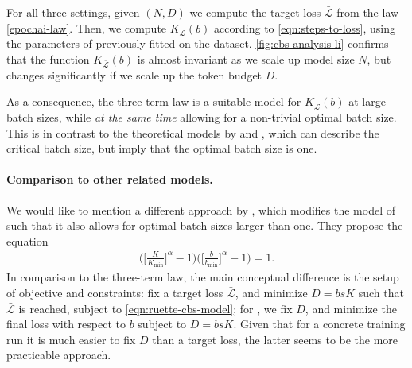 \documentclass[12pt,a4paper,twoside]{article}
\begin{document}
For all three settings, given $(N,D)$ we compute the target loss $\bar{\mathcal{L}}$ from the law \eqref{epochai-law}. Then, we compute $K_{\bar{\mathcal{L}}}(b)$ according to \eqref{eqn:steps-to-loss}, using the parameters of \tttl{} previously fitted on the \li{} dataset. \cref{fig:cbs-analysis-li} confirms that the function $K_{\bar{\mathcal{L}}}(b)$ is almost invariant as we scale up model size $N$, but changes significantly if we scale up the token budget $D$.


As a consequence, the three-term law is a suitable model for $K_{\bar{\mathcal{L}}}(b)$ at large batch sizes, while \emph{at the same time} allowing for a non-trivial optimal batch size. This is in contrast to the theoretical models by \citet{McCandlish2018,Bergsma2025} and \citet{Zhang2025}, which can describe the critical batch size, but imply that the optimal batch size is one.

\paragraph{Comparison to other related models.} We would like to mention a different approach by \citet[Section 4.5]{Ruette2026}, which modifies the model of \citet{McCandlish2018} such that it also allows for optimal batch sizes larger than one. They propose the equation
\begin{align}\label{eqn:ruette-cbs-model}
    \Big(\Big[\frac{K}{K_{\min}}\Big]^{\alpha} - 1\Big)\Big(\Big[\frac{b}{b_{\min}}\Big]^{\alpha} - 1\Big) = 1.    
\end{align}
%
In comparison to the three-term law, the main conceptual difference is the setup of objective and constraints: \citet{Ruette2026} fix a target loss $\bar{\mathcal{L}}$, and minimize $D=bsK$ such that $\bar{\mathcal{L}}$ is reached, subject to \eqref{eqn:ruette-cbs-model}; for \tttl{}, we fix $D$, and minimize the final loss with respect to $b$ subject to $D=bsK$. Given that for a concrete training run it is much easier to fix $D$ than a target loss, the latter seems to be the more practicable approach.
\end{document}
